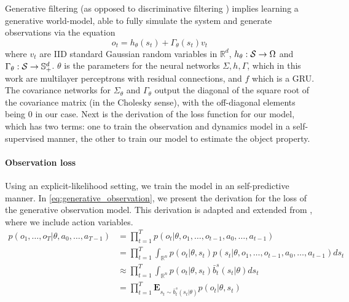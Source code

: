 \documentclass[anon]{l4dc2024}
\begin{document}
Generative filtering (as opposed to discriminative filtering \citep{bohgukf, backpropkf, dkf}) implies learning a generative world-model, able to fully simulate the system and generate observations via the equation
\begin{equation}
    o_t = h_{\theta}(s_t) + \Gamma_{\theta}(s_t)v_t
\end{equation}
where $v_t$ are \ac{IID} standard Gaussian random variables in $\mathbb{R}^d$,
$h_\theta: \mathcal{S} \rightarrow \Omega$ and
$\Gamma_\theta: \mathcal{S} \rightarrow \mathbb{S}^d_+$.
$\theta$ is the parameters for the neural networks $\Sigma, h, \Gamma$, which in this work are multilayer perceptrons with residual connections, and $f$ which is a \ac{GRU}.
The covariance networks for $\Sigma_\theta$ and $\Gamma_\theta$ output the diagonal of the square root of the covariance matrix (in the Cholesky sense), with the off-diagonal elements being 0 in our case.
Next is the derivation of the loss function for our model, which has two terms: one to train the observation and dynamics model in a self-supervised manner, the other to train our model to estimate the object property.

\paragraph{Observation loss}
Using an explicit-likelihood setting, we train the model in an self-predictive manner.
In \autoref{eq:generative_observation}, we present the derivation for the loss of the generative observation model.
This derivation is adapted and extended from \citep[][\S 12.1.1]{sarkka2013bayesian}, where we include action variables.
\begin{align}
    p(o_1, \dots, o_T | \theta, a_0, \dots, a_{T-1}) & = \prod_{t=1}^{T} p(o_t|\theta, o_1, \dots, o_{t-1}, a_0, \dots, a_{t-1})                                           \\
                                                     & = \prod_{t=1}^{T} \int_{\mathbb{R}^n} p(o_t|\theta, s_t)p(s_t|\theta, o_1, \dots, o_{t-1}, a_0, \dots, a_{t-1})ds_t \\
                                                     & \approx \prod_{t=1}^{T} \int_{\mathbb{R}^n} p(o_t|\theta, s_t)\bar{b}_t^s(s_t|\theta)ds_t                           \\
                                                     & = \prod_{t=1}^{T} \mathbf{E}_{s_t \sim \bar{b}_t^s(s_t|\theta)} p(o_t|\theta, s_t)
    \label{eq:generative_observation}
\end{align}
\end{document}
